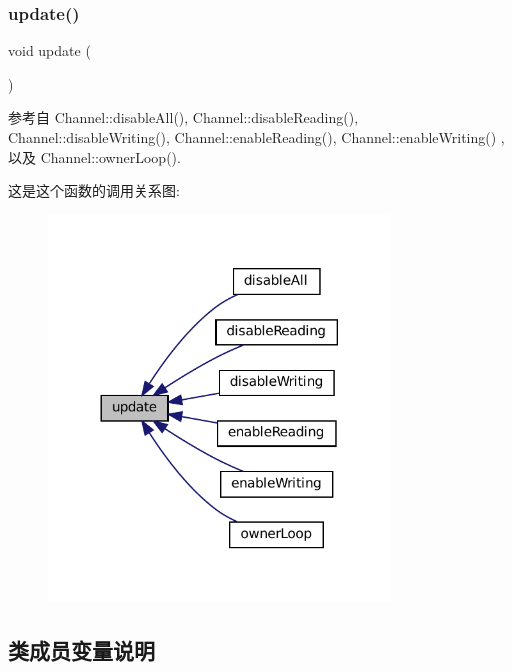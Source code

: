 \subsubsection{\texorpdfstring{update()}{update()}}
{\footnotesize\ttfamily void update (\begin{DoxyParamCaption}{ }\end{DoxyParamCaption})\hspace{0.3cm}{\ttfamily [private]}}



参考自 Channel\+::disable\+All(), Channel\+::disable\+Reading(), Channel\+::disable\+Writing(), Channel\+::enable\+Reading(), Channel\+::enable\+Writing() , 以及 Channel\+::owner\+Loop().

这是这个函数的调用关系图\+:
\nopagebreak
\begin{figure}[H]
\begin{center}
\leavevmode
\includegraphics[width=257pt]{classmuduo_1_1net_1_1Channel_ac5c54df7ed3b930268c8d7752c101725_icgraph}
\end{center}
\end{figure}


\subsection{类成员变量说明}
\mbox{\label{classmuduo_1_1net_1_1Channel_aaff5c3b39bd429a98945d94040bb828f}} 
